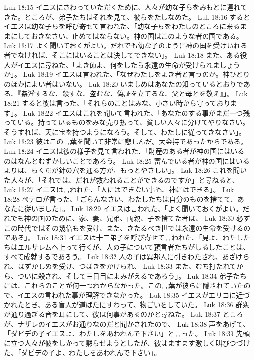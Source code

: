 Luk 18:15  イエスにさわっていただくために、人々が幼な子らをみもとに連れてきた。ところが、弟子たちはそれを見て、彼らをたしなめた。
Luk 18:16  するとイエスは幼な子らを呼び寄せて言われた、「幼な子らをわたしのところに来るままにしておきなさい、止めてはならない。神の国はこのような者の国である。
Luk 18:17  よく聞いておくがよい。だれでも幼な子のように神の国を受けいれる者でなければ、そこにはいることは決してできない」。
Luk 18:18  また、ある役人がイエスに尋ねた、「よき師よ、何をしたら永遠の生命が受けられましょうか」。
Luk 18:19  イエスは言われた、「なぜわたしをよき者と言うのか。神ひとりのほかによい者はいない。
Luk 18:20  いましめはあなたの知っているとおりである、『姦淫するな、殺すな、盗むな、偽証を立てるな、父と母とを敬え』」。
Luk 18:21  すると彼は言った、「それらのことはみな、小さい時から守っております」。
Luk 18:22  イエスはこれを聞いて言われた、「あなたのする事がまだ一つ残っている。持っているものをみな売り払って、貧しい人々に分けてやりなさい。そうすれば、天に宝を持つようになろう。そして、わたしに従ってきなさい」。
Luk 18:23  彼はこの言葉を聞いて非常に悲しんだ。大金持であったからである。
Luk 18:24  イエスは彼の様子を見て言われた、「財産のある者が神の国にはいるのはなんとむずかしいことであろう。
Luk 18:25  富んでいる者が神の国にはいるよりは、らくだが針の穴を通る方が、もっとやさしい」。
Luk 18:26  これを聞いた人々が、「それでは、だれが救われることができるのですか」と尋ねると、
Luk 18:27  イエスは言われた、「人にはできない事も、神にはできる」。
Luk 18:28  ペテロが言った、「ごらんなさい、わたしたちは自分のものを捨てて、あなたに従いました」。
Luk 18:29  イエスは言われた、「よく聞いておくがよい。だれでも神の国のために、家、妻、兄弟、両親、子を捨てた者は、
Luk 18:30  必ずこの時代ではその幾倍もを受け、また、きたるべき世では永遠の生命を受けるのである」。
Luk 18:31  イエスは十二弟子を呼び寄せて言われた、「見よ、わたしたちはエルサレムへ上って行くが、人の子について預言者たちがしるしたことは、すべて成就するであろう。
Luk 18:32  人の子は異邦人に引きわたされ、あざけられ、はずかしめを受け、つばきをかけられ、
Luk 18:33  また、むち打たれてから、ついに殺され、そして三日目によみがえるであろう」。
Luk 18:34  弟子たちには、これらのことが何一つわからなかった。この言葉が彼らに隠されていたので、イエスの言われた事が理解できなかった。
Luk 18:35  イエスがエリコに近づかれたとき、ある盲人が道ばたにすわって、物ごいをしていた。
Luk 18:36  群衆が通り過ぎる音を耳にして、彼は何事があるのかと尋ねた。
Luk 18:37  ところが、ナザレのイエスがお通りなのだと聞かされたので、
Luk 18:38  声をあげて、「ダビデの子イエスよ、わたしをあわれんで下さい」と言った。
Luk 18:39  先頭に立つ人々が彼をしかって黙らせようとしたが、彼はますます激しく叫びつづけた、「ダビデの子よ、わたしをあわれんで下さい」。
